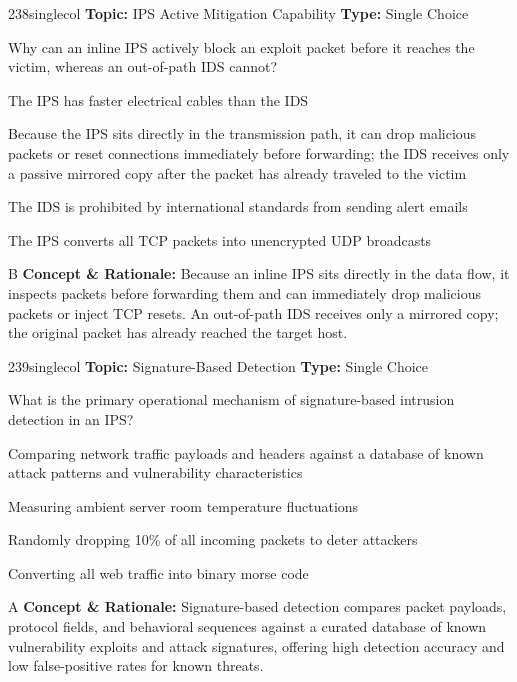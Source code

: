 \begin{qcard}{238}{singlecol}
\textcolor{darkslate!75}{\small\textbf{Topic:} IPS Active Mitigation Capability \hfill \textbf{Type:} Single Choice}\vspace{0.4em}\par
Why can an inline IPS actively block an exploit packet before it reaches the victim, whereas an out-of-path IDS cannot?
\begin{qoptions}
\item The IPS has faster electrical cables than the IDS
\item Because the IPS sits directly in the transmission path, it can drop malicious packets or reset connections immediately before forwarding; the IDS receives only a passive mirrored copy after the packet has already traveled to the victim
\item The IDS is prohibited by international standards from sending alert emails
\item The IPS converts all TCP packets into unencrypted UDP broadcasts
\end{qoptions}
\end{qcard}
\nopagebreak
\begin{explainbox}{B}
\textbf{Concept \& Rationale:} Because an inline IPS sits directly in the data flow, it inspects packets before forwarding them and can immediately drop malicious packets or inject TCP resets. An out-of-path IDS receives only a mirrored copy; the original packet has already reached the target host.
\end{explainbox}

\begin{qcard}{239}{singlecol}
\textcolor{darkslate!75}{\small\textbf{Topic:} Signature-Based Detection \hfill \textbf{Type:} Single Choice}\vspace{0.4em}\par
What is the primary operational mechanism of signature-based intrusion detection in an IPS?
\begin{qoptions}
\item Comparing network traffic payloads and headers against a database of known attack patterns and vulnerability characteristics
\item Measuring ambient server room temperature fluctuations
\item Randomly dropping 10\% of all incoming packets to deter attackers
\item Converting all web traffic into binary morse code
\end{qoptions}
\end{qcard}
\nopagebreak
\begin{explainbox}{A}
\textbf{Concept \& Rationale:} Signature-based detection compares packet payloads, protocol fields, and behavioral sequences against a curated database of known vulnerability exploits and attack signatures, offering high detection accuracy and low false-positive rates for known threats.
\end{explainbox}

